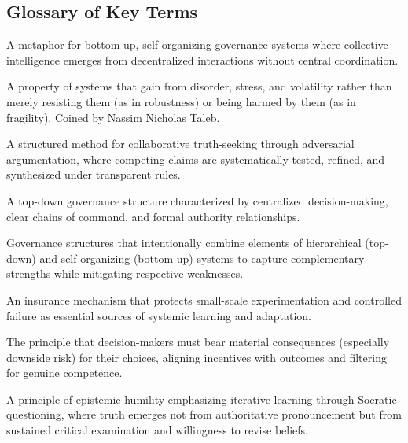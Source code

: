 \documentclass[11pt,a4paper]{article}
\begin{document}
\begin{small}
\section*{Glossary of Key Terms}

\begin{description}[style=nextline, leftmargin=0pt, labelindent=0pt, font=\normalfont\bfseries]
    \item[Anthill] A metaphor for bottom-up, self-organizing governance systems where collective intelligence emerges from decentralized interactions without central coordination.
    
    \item[Antifragility] A property of systems that gain from disorder, stress, and volatility rather than merely resisting them (as in robustness) or being harmed by them (as in fragility). Coined by Nassim Nicholas Taleb.
    
    \item[Epistemological Boxing Protocol] A structured method for collaborative truth-seeking through adversarial argumentation, where competing claims are systematically tested, refined, and synthesized under transparent rules.
    
    \item[Hierarchy] A top-down governance structure characterized by centralized decision-making, clear chains of command, and formal authority relationships.
    
    \item[Hybrid Models] Governance structures that intentionally combine elements of hierarchical (top-down) and self-organizing (bottom-up) systems to capture complementary strengths while mitigating respective weaknesses.
    
    \item[Right to Neat Chaos] An insurance mechanism that protects small-scale experimentation and controlled failure as essential sources of systemic learning and adaptation.
    
    \item[Skin in the Game] The principle that decision-makers must bear material consequences (especially downside risk) for their choices, aligning incentives with outcomes and filtering for genuine competence.
    
    \item[Socratic Tail] A principle of epistemic humility emphasizing iterative learning through Socratic questioning, where truth emerges not from authoritative pronouncement but from sustained critical examination and willingness to revise beliefs.
    

\end{description}
\end{small}
\end{document}
